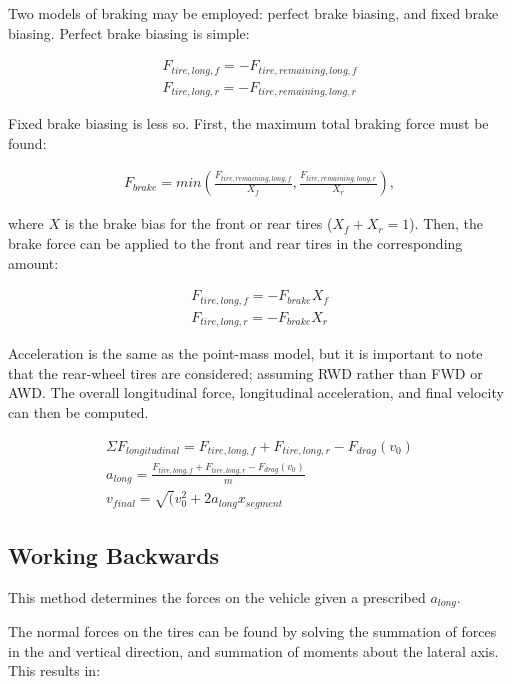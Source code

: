 \documentclass{article}
\begin{document}
Two models of braking may be employed: perfect brake biasing, and fixed brake biasing. Perfect brake biasing is simple:

\begin{align}
	F_{tire,long,f} = -F_{tire,remaining,long,f} \\
	F_{tire,long,r} = -F_{tire,remaining,long,r}
\end{align}

Fixed brake biasing is less so. First, the maximum total braking force must be found:

\begin{align}
	F_{brake} = min(\frac{F_{tire,remaining,long,f}}{X_{f}}, \frac{F_{tire,remaining,long,r}}{X_{r}}),
\end{align}

where $X$ is the brake bias for the front or rear tires ($X_f + X_r = 1$). Then, the brake force can be applied to the front and rear tires in the corresponding amount:

\begin{align}
	F_{tire,long,f} = - F_{brake} X_{f} \\
	F_{tire,long,r} = - F_{brake} X_{r}
\end{align}

Acceleration is the same as the point-mass model, but it is important to note that the rear-wheel tires are considered; assuming RWD rather than FWD or AWD. The overall longitudinal force, longitudinal acceleration, and final velocity can then be computed.

\begin{align}
	\Sigma F_{longitudinal} = F_{tire,long,f} + F_{tire,long,r} - F_{drag}(v_0) \\
	a_{long} = \frac{ F_{tire,long,f} + F_{tire,long,r} - F_{drag}(v_0)}{m} \\
	v_{final} = \sqrt(v_0^2 + 2 a_{long} x_{segment}
\end{align}

\subsection{Working Backwards}
This method determines the forces on the vehicle given a prescribed $a_{long}$.

The normal forces on the tires can be found by solving the summation of forces in the and vertical direction, and summation of moments about the lateral axis. This results in:

\begin{align}
\end{align}
\end{document}
